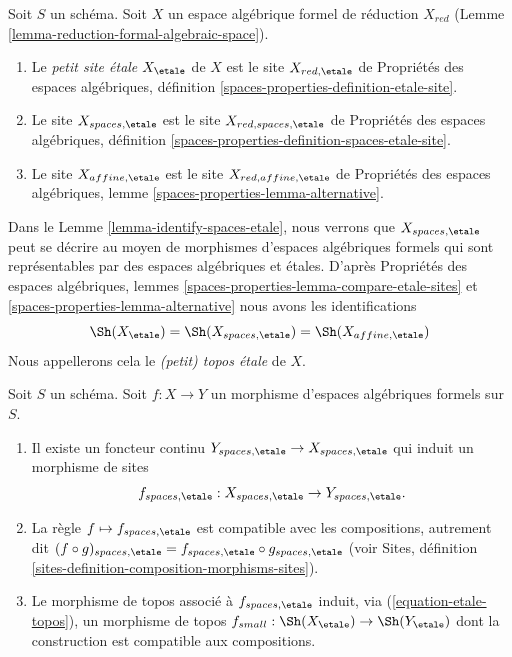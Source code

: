 \begin{definition}
\label{definition-etale-sites}
Soit $S$ un schéma. Soit $X$ un espace algébrique formel de
réduction $X_{red}$ (Lemme \ref{lemma-reduction-formal-algebraic-space}).
\begin{enumerate}
\item Le {\it petit site \'etale} $X_\etale$ de $X$ est
le site $X_{red, \etale}$ de Propriétés des espaces algébriques, définition
\ref{spaces-properties-definition-etale-site}.
\item Le site $X_{spaces, \etale}$ est le site
$X_{red, spaces, \etale}$ de Propriétés des espaces algébriques, définition
\ref{spaces-properties-definition-spaces-etale-site}.
\item Le site $X_{affine, \etale}$ est le site
$X_{red, affine, \etale}$ de Propriétés des espaces algébriques, lemme
\ref{spaces-properties-lemma-alternative}.
\end{enumerate}
\end{definition}

\noindent
Dans le Lemme \ref{lemma-identify-spaces-etale}, nous verrons que
$X_{spaces, \etale}$ peut se décrire au moyen de
morphismes d'espaces algébriques formels qui sont représentables
par des espaces algébriques et \'etales.
D'après Propriétés des espaces algébriques, lemmes
\ref{spaces-properties-lemma-compare-etale-sites} et
\ref{spaces-properties-lemma-alternative}
nous avons les identifications
\begin{equation}
\label{equation-etale-topos}
\Sh(X_\etale) = \Sh(X_{spaces, \etale}) = \Sh(X_{affine, \etale})
\end{equation}
Nous appellerons cela le {\it (petit) topos \'etale} de $X$.

\begin{lemma}
\label{lemma-functoriality-etale-site}
Soit $S$ un schéma.
Soit $f : X \to Y$ un morphisme d'espaces algébriques formels sur $S$.
\begin{enumerate}
\item Il existe un foncteur continu
$Y_{spaces, \etale} \to X_{spaces, \etale}$
qui induit un morphisme de sites
$$
f_{spaces, \etale} : X_{spaces, \etale} \to Y_{spaces, \etale}.
$$
\item La règle $f \mapsto f_{spaces, \etale}$ est compatible avec les
compositions, autrement dit $(f \circ g)_{spaces, \etale}
= f_{spaces, \etale} \circ g_{spaces, \etale}$ (voir
Sites, définition \ref{sites-definition-composition-morphisms-sites}).
\item Le morphisme de topos associé à $f_{spaces, \etale}$
induit, via (\ref{equation-etale-topos}), un morphisme de topos
$f_{small} : \Sh(X_\etale) \to \Sh(Y_\etale)$
dont la construction est compatible aux compositions.
\end{enumerate}
\end{lemma}

